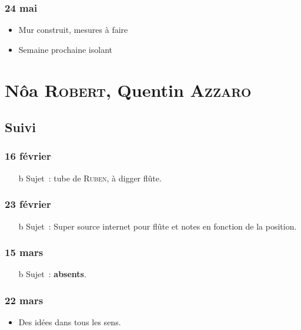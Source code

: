 \documentclass[a4paper, 11pt, final, garamond]{book}
\begin{document}
\subsection{24 mai}
\begin{itemize}
	\item Mur construit, mesures à faire
	\item Semaine prochaine isolant
\end{itemize}

\chapter{Nôa \textsc{Robert}, Quentin \textsc{Azzaro}}
\label{ch:robertazzaro}

\section{Suivi}
\subsection{16 février}
\begin{itemize}
	\item[b]{Sujet}~: tube de \textsc{Ruben}, à digger flûte.
\end{itemize}

\subsection{23 février}
\begin{itemize}
	\item[b]{Sujet}~: Super source internet pour flûte et notes en fonction de la
	position.
\end{itemize}

\subsection{15 mars}
\begin{itemize}
	\item[b]{Sujet}~: \textbf{absents}.
\end{itemize}

\subsection{22 mars}
\begin{itemize}
	\item Des idées dans tous les sens.
\end{itemize}
\end{document}
